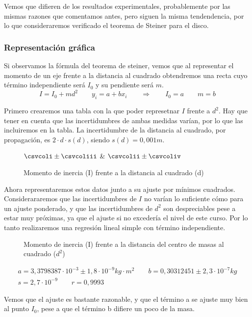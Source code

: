 \documentclass[12pt, a4paper, titlepage]{article}
\begin{document}
  Vemos que difieren de los resultados experimentales, probablemente por las mismas razones que comentamos antes, pero siguen la misma tendendencia, por lo que consideraremos verificado el teorema de Steiner para el disco.

  \subsubsection{Representación gráfica}

  Si observamos la fórmula del teorema de steiner, vemos que al representar el momento de un eje frente a la distancia al cuadrado obtendremos una recta cuyo término independiente será $I_0$ y su pendiente será $m$.
  \begin{equation*}
    I = I_0 + md^2 \qquad y_i = a + bx_i \qquad \Rightarrow \qquad
    I_0 = a \qquad m = b
  \end{equation*}

  Primero crearemos una tabla con la que poder represetnar $I$ frente a $d^2$. Hay que tener en cuenta que las incertidumbres de ambas medidas varían, por lo que las incluiremos en la tabla. La incertidumbre de la distancia al cuadrado, por propagación, es $2 \cdot d \cdot s(d)$, siendo $s(d) = 0,001m$.

  \begin{figure}[H]
    \begin{table}[H]
      \centering
        {}
        {$\csvcoli \pm \csvcoliii$ & $\csvcolii \pm \csvcoliv$}
    \end{table}
    \caption{Momento de inercia (I) frente a la distancia al cuadrado (d)}
  \end{figure}

  Ahora representaremos estos datos junto a su ajuste por mínimos cuadrados. Considerararemos que las incertidumbres de $I$ no varían lo suficiente cómo para un ajuste ponderado, y que las incertidumbres de $d^2$ son despreciables pese a estar muy próximas, ya que el ajuste si no excedería el nivel de este curso. Por lo tanto realizaremos una regresión lineal simple con término independiente.

  \begin{figure}[H]
    \hspace{3.2em} 
    \caption{Momento de inercia (I) frente a la distancia del centro de masas al cuadrado ($d^2$)}
  \end{figure}
  \begin{gather*}
    a = 3,3798387 \cdot 10^{-3} \pm 1,8 \cdot 10^{-9} kg \cdot m^2 \qquad b = 0,30312451 \pm 2,3 \cdot 10^{-7} kg \\
    s = 2,7 \cdot 10^{-9} \qquad r = 0,9993
  \end{gather*}

  Vemos que el ajuste es bastante razonable, y que el término a se ajuste muy bien al punto $I_0$, pese a que el término b difiere un poco de la masa. 
\end{document}
